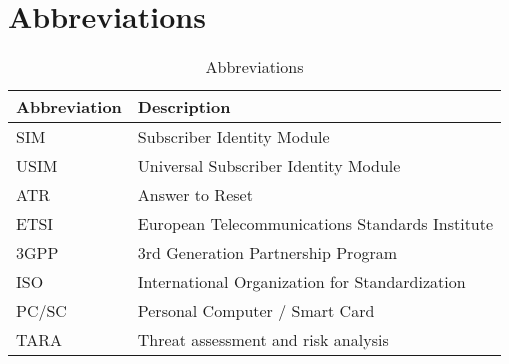 \chapter{Abbreviations}

\begin{table}[ht!]
    \centering
    \caption{Abbreviations}
    \label{tab:abbreviations}
    \begin{tabular}{|l|l|}
        \hline
        \rowcolor{lightgray}
        \textbf{Abbreviation} & \textbf{Description}           \\ \hline
        SIM & Subscriber Identity Module                       \\ \hline
        USIM & Universal Subscriber Identity Module            \\ \hline
        ATR & Answer to Reset                                  \\ \hline
        ETSI & European Telecommunications Standards Institute \\ \hline
        3GPP & 3rd Generation Partnership Program              \\ \hline
        ISO & International Organization for Standardization   \\ \hline
        PC/SC & Personal Computer / Smart Card                 \\ \hline
        TARA & Threat assessment and risk analysis             \\ \hline
    \end{tabular}
\end{table}
